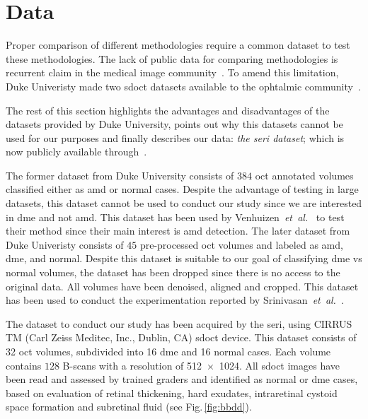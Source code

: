 \graphicspath{ {./content/method/figures/} }

\section{Data}\label{sec:data}
Proper comparison of different methodologies require a common dataset to test
these methodologies.
The lack of public data for comparing methodologies is recurrent claim in the
medical image community~\cite{giger2008anniversary}.
To amend this limitation, Duke Univeristy made two \gls{sdoct} datasets
available to the ophtalmic community~\cite{farsiu2014quantitative,Srinivasan2014}.

The rest of this section highlights the advantages and disadvantages of the
datasets provided by Duke University, points out why this datasets cannot be
used for our purposes and finally describes our data: \emph{the \gls{seri} dataset}; which is now publicly available through~\cite{seri2016apr-repoICPR}.

The former dataset from Duke University consists of $384$ \gls{oct} annotated volumes classified
either as \gls{amd} or normal cases.
Despite the advantage of testing in large datasets, this dataset cannot be used to conduct our study since we are interested in \gls{dme} and not \gls{amd}.
This dataset has been used by Venhuizen~\emph{et~al.}~\cite{Venhuizen2015} to
test their method since their main interest is \gls{amd} detection.
The later dataset from Duke Univeristy consists of $45$ pre-processed \gls{oct}
volumes and labeled as \gls{amd}, \gls{dme}, and normal. Despite this dataset is
suitable to our goal of classifying \gls{dme} vs normal volumes, the dataset has
been dropped since there is no access to the original data. All volumes have
been denoised, aligned and cropped. This dataset has been used to conduct the
experimentation reported by Srinivasan~\emph{et~al.}~\cite{Srinivasan2014}.


The dataset to conduct our study has been acquired by the \gls{seri}, using CIRRUS TM (Carl Zeiss Meditec, Inc., Dublin, CA) \gls{sdoct} device.
This dataset consists of 32 \gls{oct} volumes, subdivided into 16 \gls{dme} and 16 normal cases.
Each volume contains $128$ B-scans with a resolution of \SI[product-units=repeat]{512x1024}{\px}.
All \gls{sdoct} images have been read and assessed by trained graders and identified as normal or \gls{dme} cases, based on evaluation of retinal thickening, hard exudates, intraretinal cystoid space formation and subretinal fluid (see Fig.\,\ref{fig:bbdd}).

